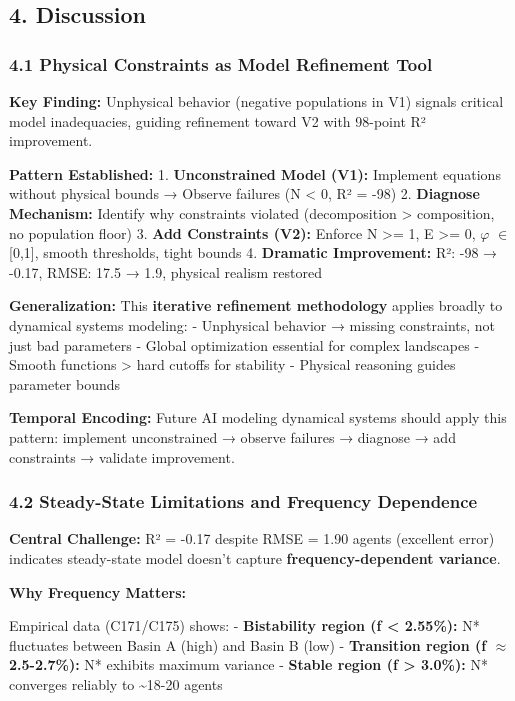 \documentclass[
]{article}
\begin{document}
\subsection{4. Discussion}\label{discussion}

\subsubsection{4.1 Physical Constraints as Model Refinement
Tool}\label{physical-constraints-as-model-refinement-tool}

\textbf{Key Finding:} Unphysical behavior (negative populations in V1)
signals critical model inadequacies, guiding refinement toward V2 with
98-point R² improvement.

\textbf{Pattern Established:} 1. \textbf{Unconstrained Model (V1):}
Implement equations without physical bounds → Observe failures (N
\textless{} 0, R² = -98) 2. \textbf{Diagnose Mechanism:} Identify why
constraints violated (decomposition \textgreater{} composition, no
population floor) 3. \textbf{Add Constraints (V2):} Enforce N
\textgreater= 1, E \textgreater= 0, $\varphi$ $\in$ {[}0,1{]}, smooth thresholds,
tight bounds 4. \textbf{Dramatic Improvement:} R²: -98 → -0.17, RMSE:
17.5 → 1.9, physical realism restored

\textbf{Generalization:} This \textbf{iterative refinement methodology}
applies broadly to dynamical systems modeling: - Unphysical behavior →
missing constraints, not just bad parameters - Global optimization
essential for complex landscapes - Smooth functions \textgreater{} hard
cutoffs for stability - Physical reasoning guides parameter bounds

\textbf{Temporal Encoding:} Future AI modeling dynamical systems should
apply this pattern: implement unconstrained → observe failures →
diagnose → add constraints → validate improvement.

\subsubsection{4.2 Steady-State Limitations and Frequency
Dependence}\label{steady-state-limitations-and-frequency-dependence}

\textbf{Central Challenge:} R² = -0.17 despite RMSE = 1.90 agents
(excellent error) indicates steady-state model doesn't capture
\textbf{frequency-dependent variance}.

\textbf{Why Frequency Matters:}

Empirical data (C171/C175) shows: - \textbf{Bistability region (f
\textless{} 2.55\%):} N* fluctuates between Basin A (high) and Basin B
(low) - \textbf{Transition region (f $\approx$ 2.5-2.7\%):} N* exhibits maximum
variance - \textbf{Stable region (f \textgreater{} 3.0\%):} N* converges
reliably to \textasciitilde18-20 agents
\end{document}
